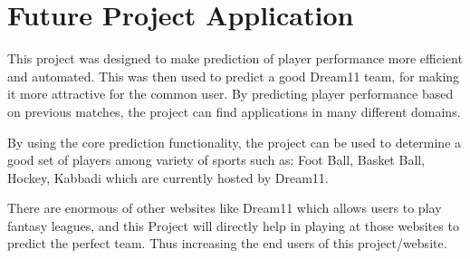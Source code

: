 \documentclass[12pt]{article}
\begin{document}
\section{Future Project Application}
This project was designed to make prediction of player performance more efficient and automated. This was then used to predict a good Dream11 team, for making it more attractive for the common user. By predicting player performance based on previous matches, the project can find applications in many different domains.
\par By using the core prediction functionality, the project can be used to determine a good set of players among variety of sports such as: Foot Ball, Basket Ball, Hockey, Kabbadi which are currently hosted by Dream11.
\par There are enormous of other websites like Dream11 which allows users to play fantasy leagues, and this Project will directly help in playing at those websites to predict the perfect team. Thus increasing the end users of this project/website.
\end{document}
